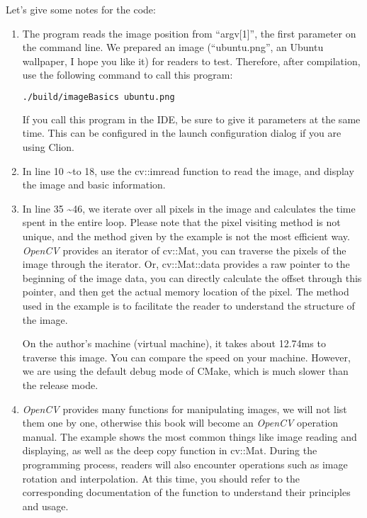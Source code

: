 Let's give some notes for the code:
\begin{enumerate}
\item The program reads the image position from ``argv[1]'', the first parameter on the command line. We prepared an image (``ubuntu.png'', an Ubuntu wallpaper, I hope you like it) for readers to test. Therefore, after compilation, use the following command to call this program:
\begin{lstlisting}[language=sh, caption=Terminal input:]
./build/imageBasics ubuntu.png
\end{lstlisting}
If you call this program in the IDE, be sure to give it parameters at the same time. This can be configured in the launch configuration dialog if you are using Clion.
\item In line 10 \textasciitilde to 18, use the cv::imread function to read the image, and display the image and basic information.
\item In line 35 \textasciitilde 46, we iterate over all pixels in the image and calculates the time spent in the entire loop. Please note that the pixel visiting method is not unique, and the method given by the example is not the most efficient way. \textit{OpenCV} provides an iterator of cv::Mat, you can traverse the pixels of the image through the iterator. Or, cv::Mat::data provides a raw pointer to the beginning of the image data, you can directly calculate the offset through this pointer, and then get the actual memory location of the pixel. The method used in the example is to facilitate the reader to understand the structure of the image.

On the author's machine (virtual machine), it takes about 12.74ms to traverse this image. You can compare the speed on your machine. However, we are using the default debug mode of CMake, which is much slower than the release mode.

\item \textit{OpenCV} provides many functions for manipulating images, we will not list them one by one, otherwise this book will become an \textit{OpenCV} operation manual. The example shows the most common things like image reading and displaying, as well as the deep copy function in cv::Mat. During the programming process, readers will also encounter operations such as image rotation and interpolation. At this time, you should refer to the corresponding documentation of the function to understand their principles and usage.
\end{enumerate}

